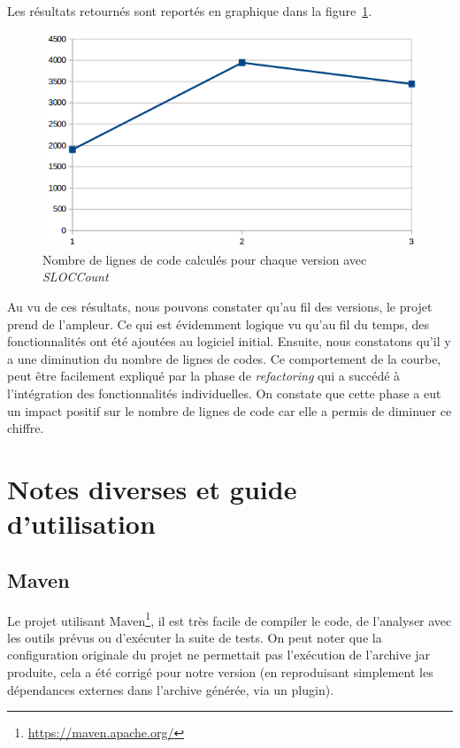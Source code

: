 \documentclass[12pt, openany]{report}
\begin{document}
Les résultats retournés sont reportés en graphique dans la figure~\ref{evolution}.

\begin{figure}[h]
	\centering
	\includegraphics[scale=0.5]{Images/evolution.png} 
	\caption{\label{evolution} Nombre de lignes de code calculés pour chaque version avec \textit{SLOCCount}}
\end{figure}

Au vu de ces résultats, nous pouvons constater qu'au fil des versions, le projet prend de l'ampleur. Ce qui est évidemment logique vu qu'au fil du temps, des fonctionnalités ont été ajoutées au logiciel initial. Ensuite, nous constatons qu'il y a une diminution du nombre de lignes de codes. Ce comportement de la courbe, peut être facilement expliqué par la phase de \textit{refactoring} qui a succédé à l'intégration des fonctionnalités individuelles. On constate que cette phase a eut un impact positif sur le nombre de lignes de code car elle a permis de diminuer ce chiffre.

\newpage
\section{Notes diverses et guide d'utilisation}
\subsection{Maven}
Le projet utilisant Maven\footnote{\url{https://maven.apache.org/}}, il est très facile de compiler le code, de l'analyser avec les outils prévus ou d'exécuter la suite de tests.
On peut noter que la configuration originale du projet ne permettait pas l'exécution de l'archive jar produite, cela a été corrigé pour notre version (en reproduisant simplement les dépendances externes dans l'archive générée, via un plugin).
\end{document}
